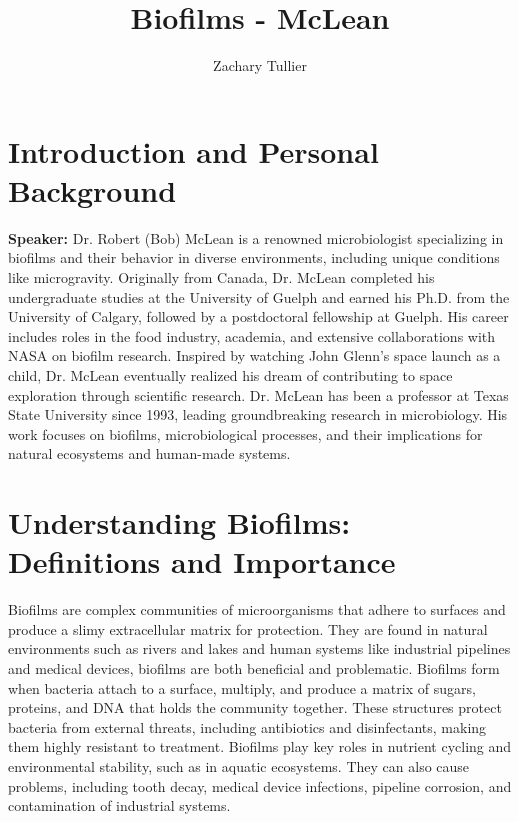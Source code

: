 \documentclass[12pt]{article}
\begin{document}
\singlespacing  %
\title{Biofilms - McLean}

\author[1]{Zachary Tullier}
\date{}
\maketitle



\section{Introduction and Personal Background}
    \textbf{Speaker:} Dr. Robert (Bob) McLean is a renowned microbiologist specializing in biofilms and their behavior in diverse environments, including unique conditions like microgravity. Originally from Canada, Dr. McLean completed his undergraduate studies at the University of Guelph and earned his Ph.D. from the University of Calgary, followed by a postdoctoral fellowship at Guelph. His career includes roles in the food industry, academia, and extensive collaborations with NASA on biofilm research. Inspired by watching John Glenn’s space launch as a child, Dr. McLean eventually realized his dream of contributing to space exploration through scientific research. Dr. McLean has been a professor at Texas State University since 1993, leading groundbreaking research in microbiology. His work focuses on biofilms, microbiological processes, and their implications for natural ecosystems and human-made systems.

\section{Understanding Biofilms: Definitions and Importance}
    Biofilms are complex communities of microorganisms that adhere to surfaces and produce a slimy extracellular matrix for protection. They are found in natural environments such as rivers and lakes and human systems like industrial pipelines and medical devices, biofilms are both beneficial and problematic. Biofilms form when bacteria attach to a surface, multiply, and produce a matrix of sugars, proteins, and DNA that holds the community together. These structures protect bacteria from external threats, including antibiotics and disinfectants, making them highly resistant to treatment. Biofilms play key roles in nutrient cycling and environmental stability, such as in aquatic ecosystems. They can also cause problems, including tooth decay, medical device infections, pipeline corrosion, and contamination of industrial systems.
\end{document}

